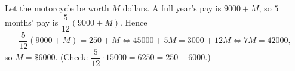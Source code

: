 Let the motorcycle be worth $M$ dollars. A full year's pay is $9000+M$, so $5$ months' pay is $\dfrac{5}{12}(9000+M)$. Hence
\[
\dfrac{5}{12}(9000+M)=250+M\iff 45000+5M=3000+12M\iff 7M=42000,
\]
so $M=\boxed{\$6000}$. (Check: $\dfrac{5}{12}\cdot15000=6250=250+6000$.)
